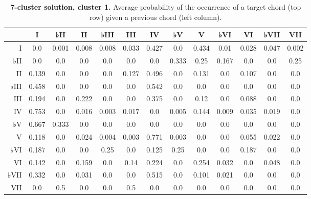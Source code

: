 \begin{table}[htbp]
\begin{minipage}{\linewidth}
\setlength{\tymax}{0.5\linewidth}
\centering
\small
\caption{\textbf{7-cluster solution, cluster 1.} Average probability of the occurrence of a target chord (top row) given a previous chord (left column).}
\label{7-clustersolutioncluster1.averageprobabilityoftheoccurrenceofatargetchordtoprowgivenapreviouschordleftcolumn.}
\begin{tabulary}{\textwidth}{@{}RCCCCCCCCCCCC@{}} \toprule
&I&♭II&II&♭III&III&IV&♭V&V&♭VI&VI&♭VII&VII\\
\midrule
I&0.0&0.001&0.008&0.008&0.033&0.427&0.0&0.434&0.01&0.028&0.047&0.002\\
♭II&0.0&0.0&0.0&0.0&0.0&0.0&0.333&0.25&0.167&0.0&0.0&0.25\\
II&0.139&0.0&0.0&0.0&0.127&0.496&0.0&0.131&0.0&0.107&0.0&0.0\\
♭III&0.458&0.0&0.0&0.0&0.0&0.542&0.0&0.0&0.0&0.0&0.0&0.0\\
III&0.194&0.0&0.222&0.0&0.0&0.375&0.0&0.12&0.0&0.088&0.0&0.0\\
IV&0.753&0.0&0.016&0.003&0.017&0.0&0.005&0.144&0.009&0.035&0.019&0.0\\
♭V&0.667&0.333&0.0&0.0&0.0&0.0&0.0&0.0&0.0&0.0&0.0&0.0\\
V&0.118&0.0&0.024&0.004&0.003&0.771&0.003&0.0&0.0&0.055&0.022&0.0\\
♭VI&0.187&0.0&0.0&0.25&0.0&0.125&0.25&0.0&0.0&0.187&0.0&0.0\\
VI&0.142&0.0&0.159&0.0&0.14&0.224&0.0&0.254&0.032&0.0&0.048&0.0\\
♭VII&0.332&0.0&0.031&0.0&0.0&0.515&0.0&0.101&0.021&0.0&0.0&0.0\\
VII&0.0&0.5&0.0&0.0&0.5&0.0&0.0&0.0&0.0&0.0&0.0&0.0\\

\bottomrule

\end{tabulary}
\end{minipage}
\end{table}

